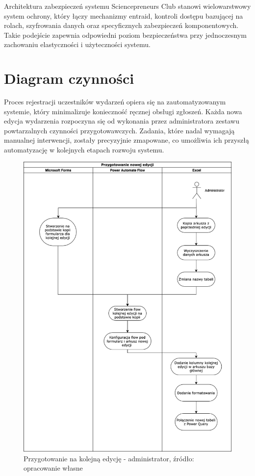 Architektura zabezpieczeń systemu Sciencepreneurs Club stanowi wielowarstwowy system ochrony, który łączy mechanizmy \gls{entraid}, kontroli dostępu bazującej na rolach, szyfrowania danych oraz specyficznych zabezpieczeń komponentowych. Takie podejście zapewnia odpowiedni poziom bezpieczeństwa przy jednoczesnym zachowaniu elastyczności i użyteczności systemu.

\section{Diagram czynności}

Proces rejestracji uczestników wydarzeń opiera się na zautomatyzowanym systemie, który minimalizuje konieczność ręcznej obsługi zgłoszeń. Każda nowa edycja wydarzenia rozpoczyna się od wykonania przez administratora zestawu powtarzalnych czynności przygotowawczych. Zadania, które nadal wymagają manualnej interwencji, zostały precyzyjnie zmapowane, co umożliwia ich przyszłą automatyzację w kolejnych etapach rozwoju systemu.

\newpage
\begin{figure}[!hb]
	\centering \includegraphics[width=0.85\linewidth]{rysunki/przygotowanie.png}
	\caption{Przygotowanie na kolejną edycję - administrator, źródło: opracowanie własne }
\end{figure}


